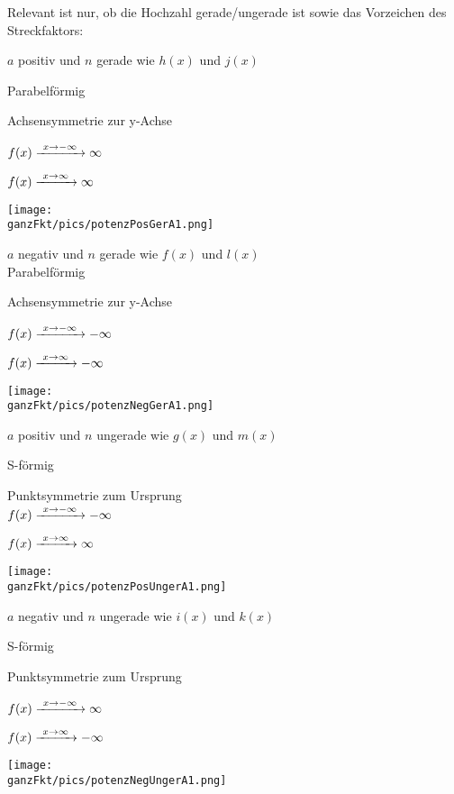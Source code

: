 \begin{Answer}[ref=potenzA1]

	Relevant ist nur, ob die Hochzahl gerade/ungerade ist sowie das Vorzeichen des Streckfaktors:

	\bigskip

	\begin{minipage}{\textwidth}
		\begin{minipage}{0.5\textwidth}\centering
			\(a\) positiv und \(n\) gerade wie \(h(x)\) und \(j(x)\)

			Parabelförmig

			Achsensymmetrie zur y-Achse

			\(f(x)\xrightarrow{\hphantom{\ }x\to-\infty\hphantom{\ }}\infty\)

			\(f(x)\xrightarrow{\hphantom{\ }x\to\infty\hphantom{\ }}\infty\)

			\texttt{[image: \\ganzFkt/pics/potenzPosGerA1.png]}
		\end{minipage}%
		\begin{minipage}{0.5\textwidth}\centering
			\(a\) negativ und \(n\) gerade wie \(f(x)\) und \(l(x)\)\\
			Parabelförmig

			Achsensymmetrie zur y-Achse

			\(f(x)\xrightarrow{\hphantom{\ }x\to-\infty\hphantom{\ }}-\infty\)

			\(f(x)\xrightarrow{\hphantom{\ }x\to\infty\hphantom{\ }}-\infty\)

			\texttt{[image: \\ganzFkt/pics/potenzNegGerA1.png]}
		\end{minipage}%

		\bigskip

		\begin{minipage}{0.5\textwidth}\centering
			\(a\) positiv und \(n\) ungerade wie \(g(x)\) und \(m(x)\)

			S-förmig

			Punktsymmetrie zum Ursprung\\
			\(f(x)\xrightarrow{\hphantom{\ }x\to-\infty\hphantom{\ }}-\infty\)

			\(f(x)\xrightarrow{\hphantom{\ }x\to\infty\hphantom{\ }}\infty\)

			\texttt{[image: \\ganzFkt/pics/potenzPosUngerA1.png]}
		\end{minipage}%
		\begin{minipage}{0.5\textwidth}\centering
			\(a\) negativ und \(n\) ungerade wie \(i(x)\) und \(k(x)\)

			S-förmig

			Punktsymmetrie zum Ursprung

			\(f(x)\xrightarrow{\hphantom{\ }x\to-\infty\hphantom{\ }}\infty\)

			\(f(x)\xrightarrow{\hphantom{\ }x\to\infty\hphantom{\ }}-\infty\)

			\texttt{[image: \\ganzFkt/pics/potenzNegUngerA1.png]}
		\end{minipage}%
	\end{minipage}
\end{Answer}